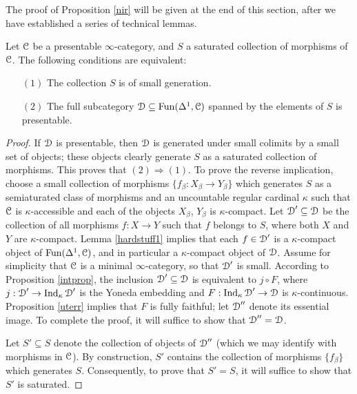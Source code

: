 The proof of Proposition \ref{nir} will be given at the end of this section, after we have established a series of technical lemmas.

\begin{lemma}\label{sweener}
Let $\operatorname{\mathcal{C}}$ be a presentable $\infty$-category, and $S$ a saturated collection of morphisms
of $\operatorname{\mathcal{C}}$. The following conditions are equivalent:
\begin{itemize}
\item[$(1)$] The collection $S$ is of small generation.
\item[$(2)$] The full subcategory $\operatorname{\mathcal{D}} \subseteq \operatorname{Fun}( \Delta^1, \operatorname{\mathcal{C}})$ spanned by the elements of
$S$ is presentable.
\end{itemize}
\end{lemma}

\begin{proof}
If $\operatorname{\mathcal{D}}$ is presentable, then $\operatorname{\mathcal{D}}$ is generated under small colimits by a small set of objects; these objects clearly generate $S$ as a saturated collection of morphisms. This proves that $(2) \Rightarrow (1)$. To prove the reverse implication, choose a small collection of morphisms $\{ f_{\beta} : X_{\beta} \rightarrow Y_{\beta} \}$ which generates $S$ as a semiaturated class of morphisms and an uncountable regular cardinal $\kappa$ such that $\operatorname{\mathcal{C}}$ is $\kappa$-accessible and each of the objects $X_{\beta}$, $Y_{\beta}$ is $\kappa$-compact. Let $\operatorname{\mathcal{D}}' \subseteq \operatorname{\mathcal{D}}$ be the collection of all morphisms $f: X \rightarrow Y$ such that $f$ belongs to $S$, where both $X$ and $Y$ are $\kappa$-compact. Lemma \ref{hardstuff1} implies that each $f \in \operatorname{\mathcal{D}}'$ is a $\kappa$-compact object of $\operatorname{Fun}(\Delta^1,\operatorname{\mathcal{C}})$, and in particular a $\kappa$-compact object of $\operatorname{\mathcal{D}}$. 
Assume for simplicity that $\operatorname{\mathcal{C}}$ is a minimal $\infty$-category, so that $\operatorname{\mathcal{D}}'$ is small. According to Proposition \ref{intprop}, the inclusion $\operatorname{\mathcal{D}}' \subseteq \operatorname{\mathcal{D}}$ is equivalent to
$j \circ F$, where $j: \operatorname{\mathcal{D}}' \rightarrow \operatorname{Ind}_{\kappa} \operatorname{\mathcal{D}}'$ is the Yoneda embedding and
$F: \operatorname{Ind}_{\kappa} \operatorname{\mathcal{D}}' \rightarrow \operatorname{\mathcal{D}}$ is $\kappa$-continuous. Proposition \ref{uterr} implies that $F$ is fully faithful; let $\operatorname{\mathcal{D}}''$ denote its essential image. To complete the proof, it will suffice to show that $\operatorname{\mathcal{D}}'' = \operatorname{\mathcal{D}}$. 

Let $S' \subseteq S$ denote the collection of objects of $\operatorname{\mathcal{D}}''$ (which we may identify with morphisms in $\operatorname{\mathcal{C}}$). By construction, $S'$ contains the collection of morphisms $\{ f_{\beta} \}$ which generates $S$. Consequently, to prove that $S' = S$, it will suffice to show that $S'$ is saturated.


\end{proof}
